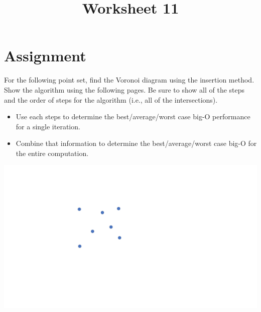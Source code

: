 \documentclass[a4paper,12pt]{article}
\title{Worksheet 11}
\begin{document}
\maketitle

\worksheetGroundRules

\worksheetSubmission

\vspace{5pt}
\section{Assignment}

For the following point set, find the Voronoi diagram using the insertion method. Show the algorithm using the following pages. Be sure to show all of the steps and the order of steps for the algorithm (i.e., all of the intersections).

\begin{itemize}

\item Use each steps to determine the best/average/worst case big-O performance for a single iteration. 
\item Combine that information to determine the best/average/worst case big-O for the entire computation.

\end{itemize}


\begin{center}
\includegraphics[width=0.65\linewidth]{../images/voronoi7.pdf}
\end{center}




\newpage
\end{document}

